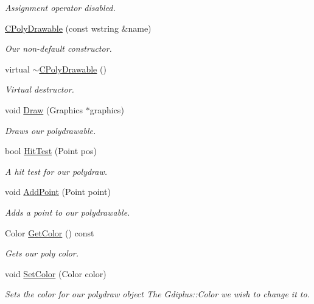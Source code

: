 \begin{DoxyCompactItemize}
\begin{DoxyCompactList}\small\item\em Assignment operator disabled. \end{DoxyCompactList}\item 
\hyperlink{class_c_poly_drawable_acc013a0894a8f20fc29ae83af8d98c02}{C\+Poly\+Drawable} (const wstring \&name)
\begin{DoxyCompactList}\small\item\em Our non-\/default constructor. \end{DoxyCompactList}\item 
virtual \hyperlink{class_c_poly_drawable_afc766fdf8f37312434063b3b615f410b}{$\sim$\+C\+Poly\+Drawable} ()
\begin{DoxyCompactList}\small\item\em Virtual destructor. \end{DoxyCompactList}\item 
void \hyperlink{class_c_poly_drawable_acbc65a156643745e0279f16a5b872917}{Draw} (Graphics $\ast$graphics)
\begin{DoxyCompactList}\small\item\em Draws our polydrawable. \end{DoxyCompactList}\item 
bool \hyperlink{class_c_poly_drawable_a24b9ca4cf68fe5aa15d72ebb9e201607}{Hit\+Test} (Point pos)
\begin{DoxyCompactList}\small\item\em A hit test for our polydraw. \end{DoxyCompactList}\item 
void \hyperlink{class_c_poly_drawable_a2b4e35ccc929379c6611ca5c9c2f27d2}{Add\+Point} (Point point)
\begin{DoxyCompactList}\small\item\em Adds a point to our polydrawable. \end{DoxyCompactList}\item 
Color \hyperlink{class_c_poly_drawable_a80d95003679e105c5cc3ea44ba27a1a1}{Get\+Color} () const 
\begin{DoxyCompactList}\small\item\em Gets our poly color. \end{DoxyCompactList}\item 
\hypertarget{class_c_poly_drawable_ac10112aae056a96e760a13092b1edc96}{void \hyperlink{class_c_poly_drawable_ac10112aae056a96e760a13092b1edc96}{Set\+Color} (Color color)}\label{class_c_poly_drawable_ac10112aae056a96e760a13092b1edc96}

\begin{DoxyCompactList}\small\item\em Sets the color for our polydraw object  The Gdiplus\+::\+Color we wish to change it to. \end{DoxyCompactList}\end{DoxyCompactItemize}
